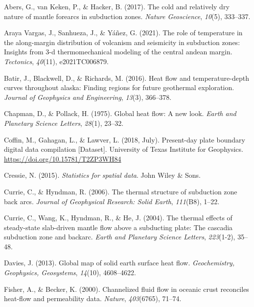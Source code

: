 \documentclass[draft,linenumbers]{agujournal2019}
\newlength{\cslhangindent}
\newenvironment{CSLReferences}[2]
 {\begin{list}{}{
  \setlength{\itemindent}{0pt}
  \setlength{\leftmargin}{0pt}
  \setlength{\parsep}{0pt}
  \ifodd #1
   \setlength{\leftmargin}{\cslhangindent}
   \setlength{\itemindent}{-\cslhangindent}
  \fi
  \setlength{\itemsep}{#2\baselineskip}
  }
  \item\relax}
 {\end{list}}
\begin{document}
\protect{}\label{refs}
\begin{CSLReferences}{1}{0}
{Abers, G., van Keken, P., \& Hacker, B.} (2017). The cold and
relatively dry nature of mantle forearcs in subduction zones.
\emph{Nature Geoscience}, \emph{10}(5), 333--337.

Araya Vargas, J., Sanhueza, J., \& Yáñez, G. (2021). The role of
temperature in the along-margin distribution of volcanism and seismicity
in subduction zones: Insights from 3-d thermomechanical modeling of the
central andean margin. \emph{Tectonics}, \emph{40}(11), e2021TC006879.

Batir, J., Blackwell, D., \& Richards, M. (2016). Heat flow and
temperature-depth curves throughout alaska: Finding regions for future
geothermal exploration. \emph{Journal of Geophysics and Engineering},
\emph{13}(3), 366--378.

Chapman, D., \& Pollack, H. (1975). Global heat flow: A new look.
\emph{Earth and Planetary Science Letters}, \emph{28}(1), 23--32.

Coffin, M., Gahagan, L., \& Lawver, L. (2018, July). {Present-day plate
boundary digital data compilation {[}Dataset{]}}. {University of Texas
Institute for Geophysics}. \url{https://doi.org/10.15781/T2ZP3WH84}

Cressie, N. (2015). \emph{Statistics for spatial data}. John Wiley \&
Sons.

Currie, C., \& Hyndman, R. (2006). The thermal structure of subduction
zone back arcs. \emph{Journal of Geophysical Research: Solid Earth},
\emph{111}(B8), 1--22.

Currie, C., Wang, K., Hyndman, R., \& He, J. (2004). The thermal effects
of steady-state slab-driven mantle flow above a subducting plate: The
cascadia subduction zone and backarc. \emph{Earth and Planetary Science
Letters}, \emph{223}(1-2), 35--48.

Davies, J. (2013). Global map of solid earth surface heat flow.
\emph{Geochemistry, Geophysics, Geosystems}, \emph{14}(10), 4608--4622.

Fisher, A., \& Becker, K. (2000). Channelized fluid flow in oceanic
crust reconciles heat-flow and permeability data. \emph{Nature},
\emph{403}(6765), 71--74.


\end{CSLReferences}
\end{document}
